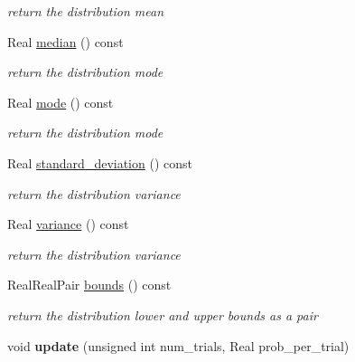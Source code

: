 \begin{DoxyCompactItemize}
\begin{DoxyCompactList}\small\item\em return the distribution mean \end{DoxyCompactList}\item 
Real \hyperlink{classPecos_1_1BinomialRandomVariable_ae1fff19ce29a79d657043a598523635d}{median} () const \label{classPecos_1_1BinomialRandomVariable_ae1fff19ce29a79d657043a598523635d}

\begin{DoxyCompactList}\small\item\em return the distribution mode \end{DoxyCompactList}\item 
Real \hyperlink{classPecos_1_1BinomialRandomVariable_a72d3d6926edd929cb3f8e12baa655f70}{mode} () const \label{classPecos_1_1BinomialRandomVariable_a72d3d6926edd929cb3f8e12baa655f70}

\begin{DoxyCompactList}\small\item\em return the distribution mode \end{DoxyCompactList}\item 
Real \hyperlink{classPecos_1_1BinomialRandomVariable_a6a4ed9624d511f8a4e4f509c82cb0706}{standard\+\_\+deviation} () const \label{classPecos_1_1BinomialRandomVariable_a6a4ed9624d511f8a4e4f509c82cb0706}

\begin{DoxyCompactList}\small\item\em return the distribution variance \end{DoxyCompactList}\item 
Real \hyperlink{classPecos_1_1BinomialRandomVariable_a4b8b05b2a9af92dad9cc304c2925a4eb}{variance} () const \label{classPecos_1_1BinomialRandomVariable_a4b8b05b2a9af92dad9cc304c2925a4eb}

\begin{DoxyCompactList}\small\item\em return the distribution variance \end{DoxyCompactList}\item 
Real\+Real\+Pair \hyperlink{classPecos_1_1BinomialRandomVariable_a4bdb95a8fa5fffaa0de5102f56963cf2}{bounds} () const \label{classPecos_1_1BinomialRandomVariable_a4bdb95a8fa5fffaa0de5102f56963cf2}

\begin{DoxyCompactList}\small\item\em return the distribution lower and upper bounds as a pair \end{DoxyCompactList}\item 
void {\bfseries update} (unsigned int num\+\_\+trials, Real prob\+\_\+per\+\_\+trial)\label{classPecos_1_1BinomialRandomVariable_a87163ad5a4f469108f079d0e8c6c2cb8}

\end{DoxyCompactItemize}
